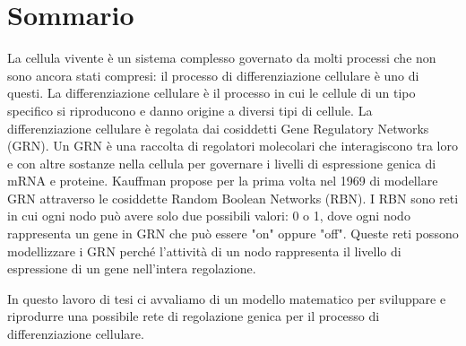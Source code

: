 \chapter*{Sommario}


La cellula vivente è un sistema complesso governato da molti processi che non sono ancora stati compresi: il processo di differenziazione cellulare è uno di questi.
La differenziazione cellulare è il processo in cui le cellule di un tipo specifico si riproducono e danno origine a diversi tipi di cellule.
La differenziazione cellulare è regolata dai cosiddetti Gene Regulatory Networks (GRN).
Un GRN è una raccolta di regolatori molecolari che interagiscono tra loro e con altre sostanze nella cellula per governare i livelli di espressione genica di mRNA e proteine.
Kauffman propose per la prima volta nel 1969 di modellare GRN attraverso le cosiddette Random Boolean Networks (RBN).
I RBN sono reti in cui ogni nodo può avere solo due possibili valori: 0 o 1, dove ogni nodo rappresenta un gene in GRN che può essere "on" oppure "off".
Queste reti possono modellizzare i GRN perché l'attività di un nodo rappresenta il livello di espressione di un gene nell'intera regolazione.

In questo lavoro di tesi ci avvaliamo di un modello matematico per sviluppare e riprodurre una possibile rete di regolazione genica per il processo di differenziazione cellulare.



